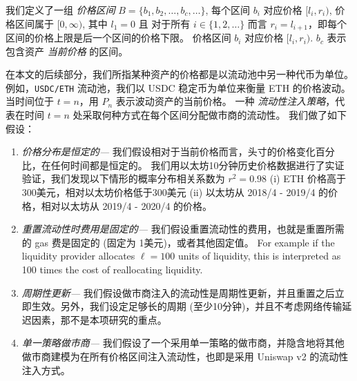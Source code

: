 \documentclass[sigconf, dvipsnames]{acmart}
\begin{document}
%
\begin{definition}[价格区间]
我们定义了一组 {\em 价格区间} $B = \{b_1, b_2, \ldots, b_c, \ldots\}$, 每个区间 $b_i$ 对应价格 $[l_i,r_i)$, 价格区间属于  $[0, \infty)$, 
其中 $l_1=0$ 且 对于所有 $i\in \{ 1, 2, \dots \}$ 而言 $r_i=l_{i+1}$，即每个区间的价格上限是后一个区间的价格下限。 
价格区间 $b_i$ 对应价格 $[l_i,r_i)$. $b_c$ 表示包含资产 {\em 当前价格} 的区间。
\end{definition}

在本文的后续部分，我们所指某种资产的价格都是以流动池中另一种代币为单位。例如，\texttt{USDC/ETH} 流动池，我们以 USDC 稳定币为单位来衡量 ETH 的价格波动。
当时间位于 $t=n$，用 $P_n$ 表示波动资产的当前价格。 
%
一种 {\em 流动性注入策略}，代表在时间 $t=n$ 处采取何种方式在每个区间分配做市商的流动性。
%
我们做了如下假设：
%
\begin{enumerate}
    \item \textit{价格分布是恒定的---} 我们假设相对于当前价格而言，头寸的价格变化百分比，在任何时间都是恒定的。
    我们用以太坊10分钟历史价格数据进行了实证验证，我们发现以下情形的概率分布相关系数为 $r^2=0.98$ 
    (i) ETH 价格高于300美元，相对以太坊价格低于300美元
    (ii) 以太坊从 2018/4 - 2019/4 的价格，相对以太坊从 2019/4 - 2020/4 的价格。
    \item \textit{重置流动性时费用是固定的---} 我们假设重置流动性的费用，也就是重置所需的 gas 费是固定的 (固定为 1美元)，或者其他固定值。
    For example if the liquidity provider allocates $\ell=100$ units of liquidity, 
    this is interpreted as 100 times the cost of reallocating  liquidity.
    \item \textit{周期性更新---} 我们假设做市商注入的流动性是周期性更新，并且重置之后立即生效。另外，我们设定足够长的周期 (至少10分钟)，并且不考虑网络传输延迟因素，那不是本项研究的重点。
    \item \textit{单一策略做市商---} 我们假设了一个采用单一策略的做市商，并隐含地将其他做市商建模为在所有价格区间注入流动性，也即是采用 Uniswap v2 的流动性注入方式。
\end{enumerate}
\end{document}
